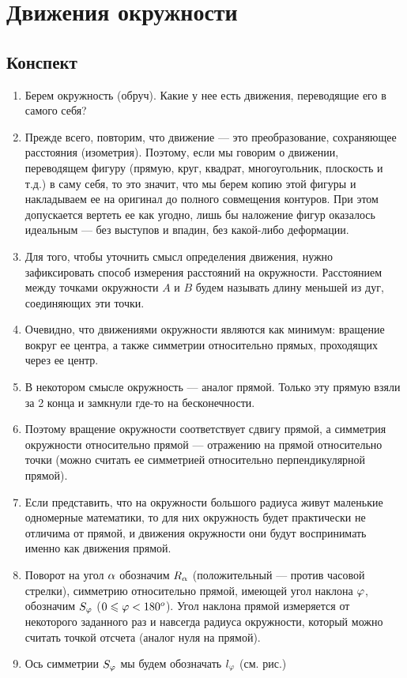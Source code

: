 \section{Движения окружности}

\subsection*{Конспект}
\begin{enumerate}\setlength{\itemsep}{1pt}
\item Берем окружность (обруч). Какие у нее есть движения, переводящие его в самого себя?
\item Прежде всего, повторим, что движение --- это преобразование, сохраняющее расстояния (изометрия). Поэтому, если мы говорим о движении, переводящем фигуру (прямую, круг, квадрат, многоугольник, плоскость и т.д.) в саму себя, то это значит, что мы берем копию этой фигуры и накладываем ее на оригинал до полного совмещения контуров. При этом допускается вертеть ее как угодно, лишь бы наложение фигур оказалось идеальным --- без выступов и впадин, без какой-либо деформации.
\item Для того, чтобы уточнить смысл определения движения, нужно зафиксировать способ измерения расстояний на окружности.  Расстоянием между точками окружности $A$ и $B$  будем называть длину меньшей из дуг, соединяющих эти точки.
\item Очевидно, что движениями окружности являются как минимум: вращение вокруг ее центра, а также симметрии относительно прямых, проходящих через ее центр.
\item В некотором смысле окружность --- аналог прямой. Только эту прямую взяли за 2 конца и замкнули где-то на бесконечности.
\item Поэтому вращение окружности соответствует сдвигу прямой, а симметрия окружности относительно прямой --- отражению на прямой относительно точки (можно считать ее симметрией относительно перпендикулярной прямой).
\item Если представить, что на окружности большого радиуса живут маленькие одномерные математики, то для них окружность будет практически не отличима от прямой, и движения окружности они будут воспринимать именно как движения прямой.
\item Поворот на угол $\alpha$ обозначим $R_\alpha$ (положительный --- против часовой стрелки), симметрию относительно прямой, имеющей угол наклона $\varphi$, обозначим $S_\varphi$ ($0\leqslant\varphi<180^o$). Угол наклона прямой измеряется от некоторого заданного раз и навсегда радиуса окружности, который можно считать точкой отсчета (аналог нуля на прямой).
\item Ось симметрии $S_\varphi$ мы будем обозначать $l_\varphi$ (см. рис.)


\end{enumerate}
